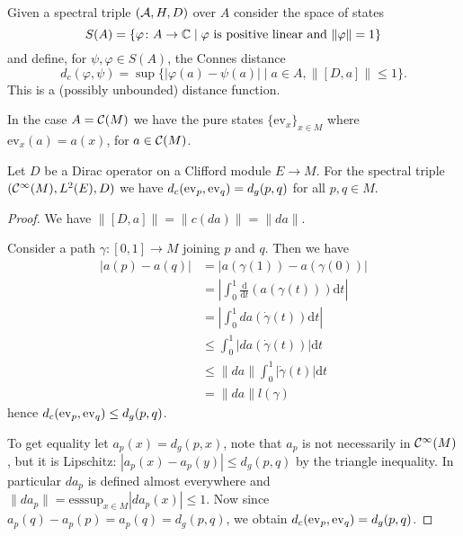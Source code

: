 \begin{definition}
 Given a spectral triple $(\mathcal{A},H,D)$ over $A$ consider the space of states $$S(A)=\{\varphi\colon A\to\mathbb{C}\mid\varphi\text{ is positive linear and }\|\varphi\|=1\}$$ and define, for $\psi,\varphi\in S(A)$, the Connes distance $$d_c(\varphi,\psi)=\sup\{|\varphi(a)-\psi(a)|\mid a\in A, \|[D,a]\|\leq 1\}.$$
 This is a (possibly unbounded) distance function.
\end{definition}

\noindent In the case $A=\mathcal{C}(M)$ we have the pure states $\{\mathrm{ev}_x\}_{x\in M}$ where $\mathrm{ev}_x(a)=a(x)$, for $a\in\mathcal{C}(M)$.

\begin{theorem}
 Let $D$ be a Dirac operator on a Clifford module $E\to M$. For the spectral triple $(\mathcal{C}^\infty(M),L^2(E),D)$ we have $d_c(\mathrm{ev}_p,\mathrm{ev}_q)=d_g(p,q)$ for all $p,q\in M$.
\end{theorem}
\begin{proof}
 We have $\|[D,a]\|=\|c(da)\|=\|da\|$. 
 
 \noindent Consider a path $\gamma\colon[0,1]\to M$ joining $p$ and $q$. Then we have 
 \begin{align*}
  |a(p)-a(q)|&=|a(\gamma(1))-a(\gamma(0))|\\&=\left|\int_0^1\frac{\mathrm{d}}{\mathrm{d}t}(a(\gamma(t)))\mathrm{d}t\right|\\
  &=\left|\int_0^1da(\dot{\gamma}(t))\mathrm{d}t\right|\\
  &\leq\int_0^1|da(\dot{\gamma}(t))|\mathrm{d}t\\
  &\leq \|da\|\int_0^1|\dot{\gamma}(t)|\mathrm{d}t\\
  &=\|da\|l(\gamma)
 \end{align*}
hence $d_c(\mathrm{ev}_p,\mathrm{ev}_q)\leq d_g(p,q)$.

\noindent To get equality let $a_p(x)=d_g(p,x)$, note that $a_p$ is not necessarily in $\mathcal{C}^\infty(M)$, but it is Lipschitz: $|a_p(x)-a_p(y)|\leq d_g(p,q)$ by the triangle inequality. In particular $da_p$ is defined almost everywhere and $\|da_p\|=\mathrm{esssup}_{x\in M}|da_p(x)|\leq 1$. Now since $a_p(q)-a_p(p)=a_p(q)=d_g(p,q)$, we obtain $d_c(\mathrm{ev}_p,\mathrm{ev}_q)=d_g(p,q)$.
\end{proof}



